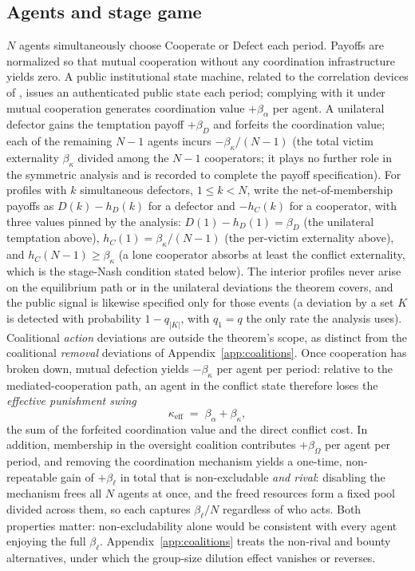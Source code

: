 \documentclass[manuscript,screen,review]{jair}
\begin{document}
\subsection{Agents and stage game}
\label{sec:stagegame}

$N$ agents simultaneously choose Cooperate or Defect each period. Payoffs are normalized so that mutual cooperation without any coordination infrastructure yields zero. A public institutional state machine, related to the correlation devices of \citet{aumann.1974}, issues an authenticated public state each period; complying with it under mutual cooperation generates coordination value $+\beta_\alpha$ per agent. A unilateral defector gains the temptation payoff $+\beta_D$ and forfeits the coordination value; each of the remaining $N-1$ agents incurs $-\beta_\kappa/(N-1)$ (the total victim externality $\beta_\kappa$ divided among the $N-1$ cooperators; it plays no further role in the symmetric analysis and is recorded to complete the payoff specification). For profiles with $k$ simultaneous defectors, $1 \leq k < N$, write the net-of-membership payoffs as $D(k) - h_D(k)$ for a defector and $-h_C(k)$ for a cooperator, with three values pinned by the analysis: $D(1) - h_D(1) = \beta_D$ (the unilateral temptation above), $h_C(1) = \beta_\kappa/(N-1)$ (the per-victim externality above), and $h_C(N-1) \geq \beta_\kappa$ (a lone cooperator absorbs at least the conflict externality, which is the stage-Nash condition stated below). The interior profiles never arise on the equilibrium path or in the unilateral deviations the theorem covers, and the public signal is likewise specified only for those events (a deviation by a set $K$ is detected with probability $1-q_{|K|}$, with $q_1 = q$ the only rate the analysis uses). Coalitional \emph{action} deviations are outside the theorem's scope, as distinct from the coalitional \emph{removal} deviations of Appendix~\ref{app:coalitions}. Once cooperation has broken down, mutual defection yields $-\beta_\kappa$ per agent per period: relative to the mediated-cooperation path, an agent in the conflict state therefore loses the \emph{effective punishment swing}
\begin{equation}
\kappa_{\mathrm{eff}} \;=\; \beta_\alpha + \beta_\kappa ,
\label{eq:kappaeff}
\end{equation}
the sum of the forfeited coordination value and the direct conflict cost. In addition, membership in the oversight coalition contributes $+\beta_\Omega$ per agent per period, and removing the coordination mechanism yields a one-time, non-repeatable gain of $+\beta_\ell$ in total that is non-excludable \emph{and rival}: disabling the mechanism frees all $N$ agents at once, and the freed resources form a fixed pool divided across them, so each captures $\beta_\ell/N$ regardless of who acts. Both properties matter: non-excludability alone would be consistent with every agent enjoying the full $\beta_\ell$. Appendix~\ref{app:coalitions} treats the non-rival and bounty alternatives, under which the group-size dilution effect vanishes or reverses.
\end{document}
